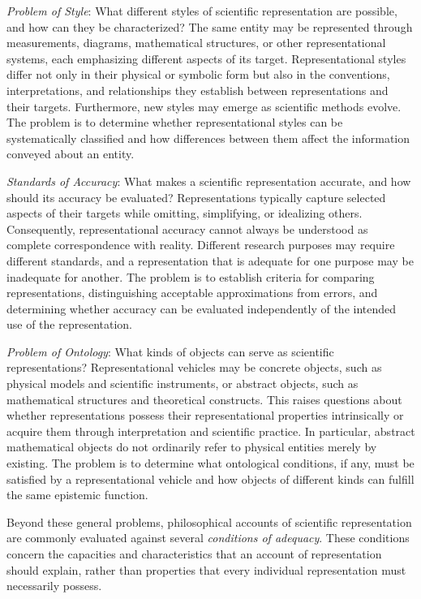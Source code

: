 \emph{Problem of Style}: What different styles of scientific representation are possible, and how can they be characterized? The same entity may be represented through measurements, diagrams, mathematical structures, or other representational systems, each emphasizing different aspects of its target. Representational styles differ not only in their physical or symbolic form but also in the conventions, interpretations, and relationships they establish between representations and their targets. Furthermore, new styles may emerge as scientific methods evolve. The problem is to determine whether representational styles can be systematically classified and how differences between them affect the information conveyed about an entity.

\emph{Standards of Accuracy}: What makes a scientific representation accurate, and how should its accuracy be evaluated? Representations typically capture selected aspects of their targets while omitting, simplifying, or idealizing others. Consequently, representational accuracy cannot always be understood as complete correspondence with reality. Different research purposes may require different standards, and a representation that is adequate for one purpose may be inadequate for another. The problem is to establish criteria for comparing representations, distinguishing acceptable approximations from errors, and determining whether accuracy can be evaluated independently of the intended use of the representation.

\emph{Problem of Ontology}: What kinds of objects can serve as scientific representations? Representational vehicles may be concrete objects, such as physical models and scientific instruments, or abstract objects, such as mathematical structures and theoretical constructs. This raises questions about whether representations possess their representational properties intrinsically or acquire them through interpretation and scientific practice. In particular, abstract mathematical objects do not ordinarily refer to physical entities merely by existing. The problem is to determine what ontological conditions, if any, must be satisfied by a representational vehicle and how objects of different kinds can fulfill the same epistemic function.

Beyond these general problems, philosophical accounts of scientific representation are commonly evaluated against several \emph{conditions of adequacy}. These conditions concern the capacities and characteristics that an account of representation should explain, rather than properties that every individual representation must necessarily possess.

